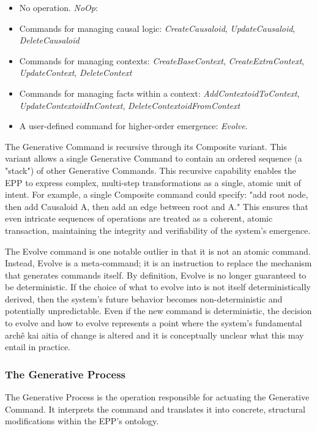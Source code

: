 \begin{itemize}
	\item No operation. \textit{NoOp}:
	\item  Commands for managing causal logic: \textit{CreateCausaloid}, \textit{UpdateCausaloid}, \textit{DeleteCausaloid}
	\item Commands for managing contexts: \textit{CreateBaseContext}, \textit{CreateExtraContext}, \textit{UpdateContext}, \textit{DeleteContext}
	\item Commands for managing facts within a context: \textit{AddContextoidToContext}, \textit{UpdateContextoidInContext}, \textit{DeleteContextoidFromContext}
	\item A user-defined command for higher-order emergence: \textit{Evolve}.
\end{itemize}

The Generative Command is recursive through its Composite variant. This variant allows a single Generative Command to contain an ordered sequence (a "stack") of other  Generative Commands. This recursive capability enables the EPP to express complex, multi-step transformations as a single, atomic unit of intent. For example, a single Composite command could specify: "add root node, then add Causaloid A, then add an edge between root and A." This ensures that even intricate sequences of operations are treated as a coherent, atomic transaction, maintaining the integrity and verifiability of the system's emergence.  

The Evolve command is one notable outlier in that it is not an atomic command. Instead, Evolve is a meta-command; it is an instruction to replace the mechanism that generates commands itself. By definition, Evolve is no longer guaranteed to be  deterministic.  If the choice of what to evolve into is not itself deterministically derived, then the system's future behavior becomes non-deterministic and potentially unpredictable. Even if the new command is deterministic, the decision to evolve and how to evolve represents a point where the system's fundamental archê kai aitia of change is altered and it is conceptually unclear what this may entail in practice. 

\subsubsection{The Generative Process}
\label{sec:ontology_emgerence_gen_process}

The Generative Process is the operation responsible for actuating the Generative Command. It interprets the command and translates it into concrete, structural modifications within the EPP's ontology. 

